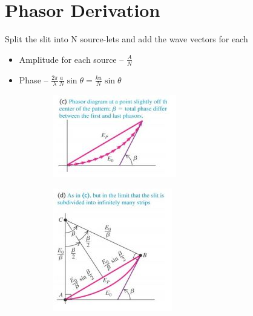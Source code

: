 \documentclass[a4paper, 11pt, fleqn, normalem]{report}
\begin{document}
\section{Phasor Derivation}
Split the slit into N source-lets and add the wave vectors for each
\begin{itemize}
    \item[] Amplitude for each source -- $\frac{A}{N}$
    \item[] Phase -- $\frac{2\pi}{\lambda}\frac{a}{N}\sin{\theta} = \frac{ka}{N}\sin{\theta}$
\end{itemize}
\begin{figure}[H]
    \begin{subfigure}{0.4\textwidth}
        \includegraphics[width=\textwidth]{Phas1.jpg}
    \end{subfigure}
    \begin{subfigure}{0.4\textwidth}
        \includegraphics[width=\textwidth]{Phas2.jpg}
    \end{subfigure}
\end{figure}
\end{document}
